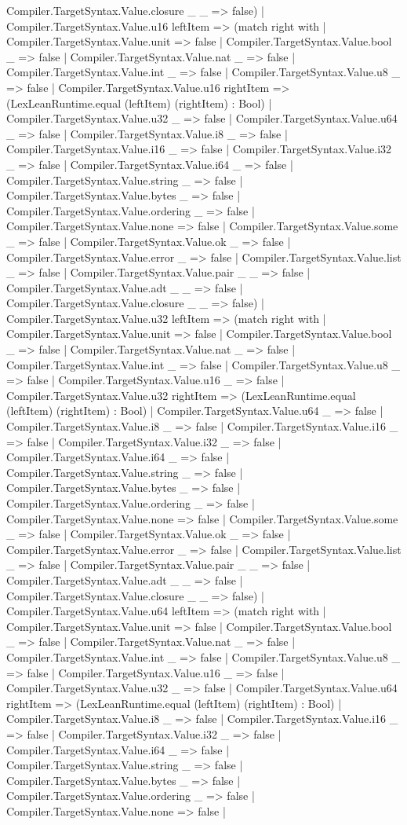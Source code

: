 \documentclass[11pt]{article}
\begin{document}
Compiler.TargetSyntax.Value.closure \_ \_ => false) | Compiler.TargetSyntax.Value.u16 leftItem => (match right with | Compiler.TargetSyntax.Value.unit => false | Compiler.TargetSyntax.Value.bool \_ => false | Compiler.TargetSyntax.Value.nat \_ => false | Compiler.TargetSyntax.Value.int \_ => false | Compiler.TargetSyntax.Value.u8 \_ => false | Compiler.TargetSyntax.Value.u16 rightItem => (LexLeanRuntime.equal (leftItem) (rightItem) : Bool) | Compiler.TargetSyntax.Value.u32 \_ => false | Compiler.TargetSyntax.Value.u64 \_ => false | Compiler.TargetSyntax.Value.i8 \_ => false | Compiler.TargetSyntax.Value.i16 \_ => false | Compiler.TargetSyntax.Value.i32 \_ => false | Compiler.TargetSyntax.Value.i64 \_ => false | Compiler.TargetSyntax.Value.string \_ => false | Compiler.TargetSyntax.Value.bytes \_ => false | Compiler.TargetSyntax.Value.ordering \_ => false | Compiler.TargetSyntax.Value.none => false | Compiler.TargetSyntax.Value.some \_ => false | Compiler.TargetSyntax.Value.ok \_ => false | Compiler.TargetSyntax.Value.error \_ => false | Compiler.TargetSyntax.Value.list \_ => false | Compiler.TargetSyntax.Value.pair \_ \_ => false | Compiler.TargetSyntax.Value.adt \_ \_ => false | Compiler.TargetSyntax.Value.closure \_ \_ => false) | Compiler.TargetSyntax.Value.u32 leftItem => (match right with | Compiler.TargetSyntax.Value.unit => false | Compiler.TargetSyntax.Value.bool \_ => false | Compiler.TargetSyntax.Value.nat \_ => false | Compiler.TargetSyntax.Value.int \_ => false | Compiler.TargetSyntax.Value.u8 \_ => false | Compiler.TargetSyntax.Value.u16 \_ => false | Compiler.TargetSyntax.Value.u32 rightItem => (LexLeanRuntime.equal (leftItem) (rightItem) : Bool) | Compiler.TargetSyntax.Value.u64 \_ => false | Compiler.TargetSyntax.Value.i8 \_ => false | Compiler.TargetSyntax.Value.i16 \_ => false | Compiler.TargetSyntax.Value.i32 \_ => false | Compiler.TargetSyntax.Value.i64 \_ => false | Compiler.TargetSyntax.Value.string \_ => false | Compiler.TargetSyntax.Value.bytes \_ => false | Compiler.TargetSyntax.Value.ordering \_ => false | Compiler.TargetSyntax.Value.none => false | Compiler.TargetSyntax.Value.some \_ => false | Compiler.TargetSyntax.Value.ok \_ => false | Compiler.TargetSyntax.Value.error \_ => false | Compiler.TargetSyntax.Value.list \_ => false | Compiler.TargetSyntax.Value.pair \_ \_ => false | Compiler.TargetSyntax.Value.adt \_ \_ => false | Compiler.TargetSyntax.Value.closure \_ \_ => false) | Compiler.TargetSyntax.Value.u64 leftItem => (match right with | Compiler.TargetSyntax.Value.unit => false | Compiler.TargetSyntax.Value.bool \_ => false | Compiler.TargetSyntax.Value.nat \_ => false | Compiler.TargetSyntax.Value.int \_ => false | Compiler.TargetSyntax.Value.u8 \_ => false | Compiler.TargetSyntax.Value.u16 \_ => false | Compiler.TargetSyntax.Value.u32 \_ => false | Compiler.TargetSyntax.Value.u64 rightItem => (LexLeanRuntime.equal (leftItem) (rightItem) : Bool) | Compiler.TargetSyntax.Value.i8 \_ => false | Compiler.TargetSyntax.Value.i16 \_ => false | Compiler.TargetSyntax.Value.i32 \_ => false | Compiler.TargetSyntax.Value.i64 \_ => false | Compiler.TargetSyntax.Value.string \_ => false | Compiler.TargetSyntax.Value.bytes \_ => false | Compiler.TargetSyntax.Value.ordering \_ => false | Compiler.TargetSyntax.Value.none => false | 
\end{document}

